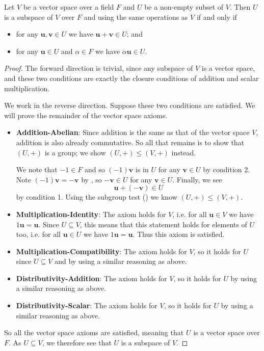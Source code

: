 \begin{theorem}\label{thrm-subspace-test}
    Let $V$ be a vector space over a field $F$ and $U$ be a non-empty subset of $V$. Then $U$ is a subspace of $V$ over $F$ and using the same operations as $V$ if and only if
    \begin{itemize}
        \item for any $\textbf{u}, \textbf{v} \in U$ we have $\textbf{u} + \textbf{v} \in U$; and
        \item for any $\textbf{u} \in U$ and $\alpha \in F$ we have $\alpha\textbf{u} \in U$.
    \end{itemize}
\end{theorem}
\begin{proof}
    The forward direction is trivial, since any subspace of $V$ is a vector space, and these two conditions are exactly the closure conditions of addition and scalar multiplication.

    We work in the reverse direction. Suppose these two conditions are satisfied. We will prove the remainder of the vector space axioms.
    \begin{itemize}
        \item \textbf{Addition-Abelian}: Since addition is the same as that of the vector space $V$, addition is also already commutative. So all that remains is to show that $(U, +)$ is a group; we show $(U, +) \leq (V, +)$ instead.

        We note that $-1 \in F$ and so $(-1)\textbf{v}$ is in $U$ for any $\textbf{v} \in U$ by condition 2. Note $(-1)\textbf{v} = -\textbf{v}$ by , so $-\textbf{v} \in U$ for any $\textbf{v} \in U$. Finally, we see
        \[
            \textbf{u} + (-\textbf{v}) \in U
        \]
        by condition 1. Using the subgroup test () we know $(U, +) \leq (V, +)$.

        \item \textbf{Multiplication-Identity}: The axiom holds for $V$, i.e. for all $\textbf{u} \in V$ we have $1\textbf{u} = \textbf{u}$. Since $U \subseteq V$, this means that this statement holds for elements of $U$ too, i.e. for all $\textbf{u} \in U$ we have $1\textbf{u} = \textbf{u}$. Thus this axiom is satisfied.

        \item \textbf{Multiplication-Compatibility}: The axiom holds for $V$, so it holds for $U$ since $U \subseteq V$ and by using a similar reasoning as above.

        \item \textbf{Distributivity-Addition}: The axiom holds for $V$, so it holds for $U$ by using a similar reasoning as above.

        \item \textbf{Distributivity-Scalar}: The axiom holds for $V$, so it holds for $U$ by using a similar reasoning as above.
    \end{itemize}
    So all the vector space axioms are satisfied, meaning that $U$ is a vector space over $F$. As $U \subseteq V$, we therefore see that $U$ is a subspace of $V$.
\end{proof}
